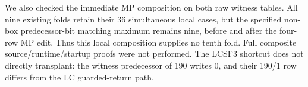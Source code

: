 We also checked the immediate MP composition on both raw witness tables.
All nine existing folds retain their 36 simultaneous local cases, but the
specified non-box predecessor-bit matching maximum remains nine, before and
after the four-row MP edit. Thus this local composition supplies no tenth fold.
Full composite source/runtime/startup proofs were not performed. The LCSF3
shortcut does not directly transplant: the witness predecessor of 190 writes 0,
and their 190/1 row differs from the LC guarded-return path.
